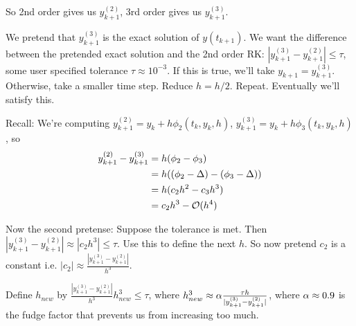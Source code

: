 So 2nd order gives us $y_{k+1}^{(2)}$, 3rd order gives us
$y_{k+1}^{(3)}$.

We pretend that $y_{k+1}^{(3)}$ is the exact solution of $y(t_{k+1})$.
We want the difference between the pretended exact solution and the
2nd order RK: $|y_{k+1}^{(3)} - y_{k+1}^{(2)}| \le \tau$, some user
specified tolerance $\tau\approx 10^{-3}$. If this is true, we'll take
$y_{k+1} = y_{k+1}^{(3)}$. Otherwise, take a smaller time step. Reduce
$h=h/2$. Repeat. Eventually we'll satisfy this.

Recall: We're computing $y_{k+1}^{(2)} = y_k + h \phi_2(t_k,y_k,h)$,
$y_{k+1}^{(3)} = y_k + h \phi_3(t_k,y_k,h)$, so 
\begin{align*}
y_{k+1}^{(2)}-y_{k+1}^{(3)} &=h(\phi_2-\phi_3)\\  
&=h((\phi_2-\Delta)-(\phi_3-\Delta))\\  
&= h(c_2h^2  - c_3h^3)\\
&= c_2h^3 - \mathcal{O}(h^4)
\end{align*}

Now the second pretense: Suppose the tolerance is met. Then
$|y_{k+1}^{(3)} - y_{k+1}^{(2)}|\approx |c_2h^3| \le \tau$. Use this
to define the next $h$. So now pretend $c_2$ is a constant i.e. $|c_2|
\approx \frac{|y_{k+1}^{(3)} - y_{k+1}^{(2)}|}{h^3}$.

Define $h_{new}$ by $\frac{|y_{k+1}^{(3)} -
  y_{k+1}^{(2)}|}{h^3}h^3_{new}\le \tau$, where $h^3_{new} \approx \alpha
\frac{\tau h}{|y_{k+1}^{(3)} -  y_{k+1}^{(2)}|}$, where $\alpha\approx 0.9$ is the
fudge factor that prevents us from increasing too much.



